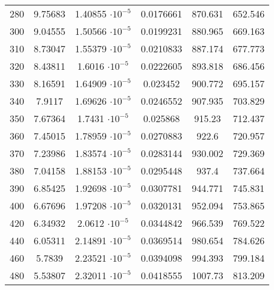 \begin{table}
\begin{center}
\begin{tabular}{cccccc}
280	&	9.75683	&	1.40855 $ \cdot 10^{-5}$	&	0.0176661	&	870.631	&	652.546	\\
300	&	9.04555	&	1.50566 $ \cdot 10^{-5}$	&	0.0199231	&	880.965	&	669.163	\\
310	&	8.73047	&	1.55379 $ \cdot 10^{-5}$	&	0.0210833	&	887.174	&	677.773	\\
320	&	8.43811	&	1.6016 $ \cdot 10^{-5}$	&	0.0222605	&	893.818	&	686.456	\\
330	&	8.16591	&	1.64909 $ \cdot 10^{-5}$	&	0.023452	&	900.772	&	695.157	\\
340	&	7.9117	&	1.69626 $ \cdot 10^{-5}$	&	0.0246552	&	907.935	&	703.829	\\
350	&	7.67364	&	1.7431 $ \cdot 10^{-5}$	&	0.025868	&	915.23	&	712.437	\\
360	&	7.45015	&	1.78959 $ \cdot 10^{-5}$	&	0.0270883	&	922.6	&	720.957	\\
370	&	7.23986	&	1.83574 $ \cdot 10^{-5}$	&	0.0283144	&	930.002	&	729.369	\\
380	&	7.04158	&	1.88153 $ \cdot 10^{-5}$	&	0.0295448	&	937.4	&	737.664	\\
390	&	6.85425	&	1.92698 $ \cdot 10^{-5}$	&	0.0307781	&	944.771	&	745.831	\\
400	&	6.67696	&	1.97208 $ \cdot 10^{-5}$	&	0.0320131	&	952.094	&	753.865	\\
420	&	6.34932	&	2.0612 $ \cdot 10^{-5}$	&	0.0344842	&	966.539	&	769.522	\\
440	&	6.05311	&	2.14891 $ \cdot 10^{-5}$	&	0.0369514	&	980.654	&	784.626	\\
460	&	5.7839	&	2.23521 $ \cdot 10^{-5}$	&	0.0394098	&	994.393	&	799.184	\\
480	&	5.53807	&	2.32011 $ \cdot 10^{-5}$	&	0.0418555	&	1007.73	&	813.209	\\
\bottomrule
\end{tabular}
\end{center}
\end{table}



